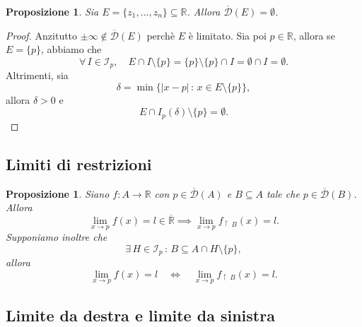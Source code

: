 \documentclass{article}
\theoremstyle{plain}
\newtheorem{prop}[thm]{Proposizione}
\theoremstyle{definition}
\theoremstyle{remark}
\begin{document}
\vspace{10pt}

\begin{bxthm}
\begin{prop}
    Sia $E=\{z_1,...,z_n\}\subseteq\mathbb{R}$. Allora $\overline{\mathcal{D}}(E)=\emptyset$.
\end{prop}
\end{bxthm}
\begin{proof}
    Anzitutto $\pm\infty\notin\overline{\mathcal{D}}(E)$ perchè $E$ è limitato. 
    Sia poi $p\in\mathbb{R}$, allora se $E=\{p\}$, abbiamo che 
    \[\forall\, I\in \mathcal{I}_p,\quad E\cap I\setminus\{p\}=\{p\}\setminus\{p\}\cap I=\emptyset\cap I=\emptyset.\]
    Altrimenti, sia \[\delta=\min\{|x-p|\,:\,x\in E\setminus\{p\}\},\]
    allora $\delta>0$ e \[E\cap I_p(\delta)\setminus\{p\}=\emptyset.\]
\end{proof}

\vspace{10pt}

\subsection{Limiti di restrizioni}

\vspace{10pt}

\begin{bxthm}
\begin{prop}
    Siano $f:A\to\mathbb{R}$ con $p\in\overline{\mathcal{D}}(A)$ e $B\subseteq A$ tale che $p\in\overline{\mathcal{D}}(B)$.
    Allora 
    \[\lim_{x\to p}f(x)=l\in\overline{\mathbb{R}}\implies \lim_{x\to p}f_{\upharpoonright \  B}(x)=l.\]
    Supponiamo inoltre che 
    \[\exists\, H\in \mathcal{I}_p\,:\,B\subseteq A\cap H\setminus\{p\},\]
    allora \[\lim_{x\to p}f(x)=l\quad\iff\quad\lim_{x\to p}f_{\upharpoonright \  B}(x)=l.\]
\end{prop}
\end{bxthm}

\vspace{10pt}

\subsection{Limite da destra e limite da sinistra}

\vspace{10pt}
\end{document}

